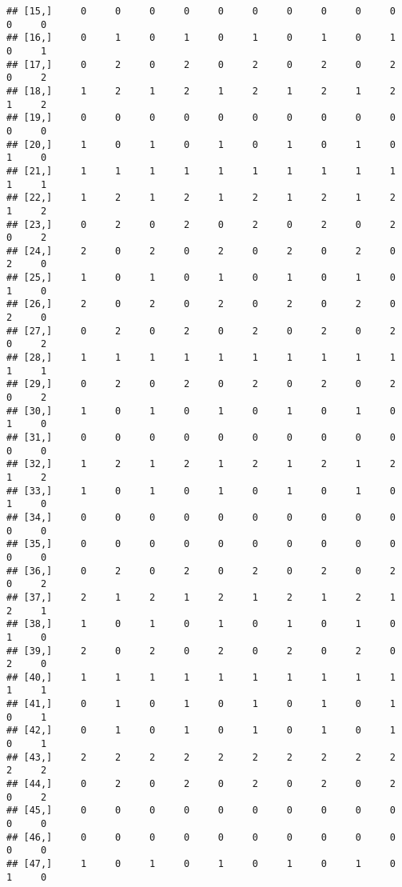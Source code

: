 \documentclass[
]{article}
\begin{document}
\begin{verbatim}
## [15,]     0     0     0     0     0     0     0     0     0     0     0     0
## [16,]     0     1     0     1     0     1     0     1     0     1     0     1
## [17,]     0     2     0     2     0     2     0     2     0     2     0     2
## [18,]     1     2     1     2     1     2     1     2     1     2     1     2
## [19,]     0     0     0     0     0     0     0     0     0     0     0     0
## [20,]     1     0     1     0     1     0     1     0     1     0     1     0
## [21,]     1     1     1     1     1     1     1     1     1     1     1     1
## [22,]     1     2     1     2     1     2     1     2     1     2     1     2
## [23,]     0     2     0     2     0     2     0     2     0     2     0     2
## [24,]     2     0     2     0     2     0     2     0     2     0     2     0
## [25,]     1     0     1     0     1     0     1     0     1     0     1     0
## [26,]     2     0     2     0     2     0     2     0     2     0     2     0
## [27,]     0     2     0     2     0     2     0     2     0     2     0     2
## [28,]     1     1     1     1     1     1     1     1     1     1     1     1
## [29,]     0     2     0     2     0     2     0     2     0     2     0     2
## [30,]     1     0     1     0     1     0     1     0     1     0     1     0
## [31,]     0     0     0     0     0     0     0     0     0     0     0     0
## [32,]     1     2     1     2     1     2     1     2     1     2     1     2
## [33,]     1     0     1     0     1     0     1     0     1     0     1     0
## [34,]     0     0     0     0     0     0     0     0     0     0     0     0
## [35,]     0     0     0     0     0     0     0     0     0     0     0     0
## [36,]     0     2     0     2     0     2     0     2     0     2     0     2
## [37,]     2     1     2     1     2     1     2     1     2     1     2     1
## [38,]     1     0     1     0     1     0     1     0     1     0     1     0
## [39,]     2     0     2     0     2     0     2     0     2     0     2     0
## [40,]     1     1     1     1     1     1     1     1     1     1     1     1
## [41,]     0     1     0     1     0     1     0     1     0     1     0     1
## [42,]     0     1     0     1     0     1     0     1     0     1     0     1
## [43,]     2     2     2     2     2     2     2     2     2     2     2     2
## [44,]     0     2     0     2     0     2     0     2     0     2     0     2
## [45,]     0     0     0     0     0     0     0     0     0     0     0     0
## [46,]     0     0     0     0     0     0     0     0     0     0     0     0
## [47,]     1     0     1     0     1     0     1     0     1     0     1     0

\end{verbatim}
\end{document}
